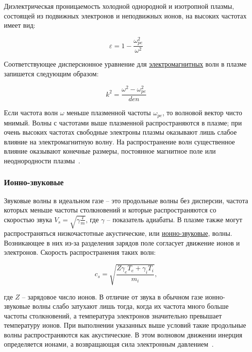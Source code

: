 \documentclass[10pt, a4paper]{article}
\begin{document}
Диэлектрическая проницаемость холодной однородной и изотропной плазмы, состоящей из подвижных электронов и неподвижных ионов, на высоких частотах имеет вид:

\begin{equation*}
	\varepsilon = 1-\frac{\omega_{pe}^2}{\omega^2}
\end{equation*}

Соответствующее дисперсионное уравнение для \uline{электромагнитных} волн в плазме запишется следующим образом:

\begin{equation*}
	k^2 = \frac{\omega^2-\omega_{pe}^2}{den}
\end{equation*}

Если частота волн $\omega$ меньше плазменной частоты $\omega_{pe}$, то волновой вектор чисто мнимый. Волны с частотами выше плазменной распространяются в плазме; при очень высоких частотах свободные электроны плазмы оказывают лишь слабое влияние на электромагнитную волну. На распространение волн существенное влияние оказывают конечные размеры, постоянное магнитное поле или неоднородности плазмы~\cite{kroll}.

\subsubsection{Ионно-звуковые}

Звуковые волны в идеальном газе -- это продольные волны без  дисперсии, частота которых меньше частоты столкновений и которые  распространяются со скоростью звука $V_s=\sqrt{\gamma\frac{T}{m}}$, где $\gamma$ -- показатель адиабаты. В плазме также могут  распространяться низкочастотные акустические, или \uline{ионно-звуковые}, волны.  Возникающее в них из-за разделения зарядов поле согласует движение ионов и электронов. Скорость распространения таких волн:

\begin{equation*}
	c_s = \sqrt{\frac{Z\gamma_eT_e+\gamma_iT_i}{m_i}},
\end{equation*}

где $Z$ -- зарядовое число ионов. В отличие от звука в обычном газе ионно-звуковые волны слабо затухают лишь тогда, когда их частота много больше частоты столкновений, а температура электронов значительно превышает температуру ионов. При выполнении указанных выше условий такие продольные волны распространяются как акустические. В этом волновом движении инерция определяется ионами, а возвращающая сила электронным давлением~\cite{kroll}.
\end{document}
